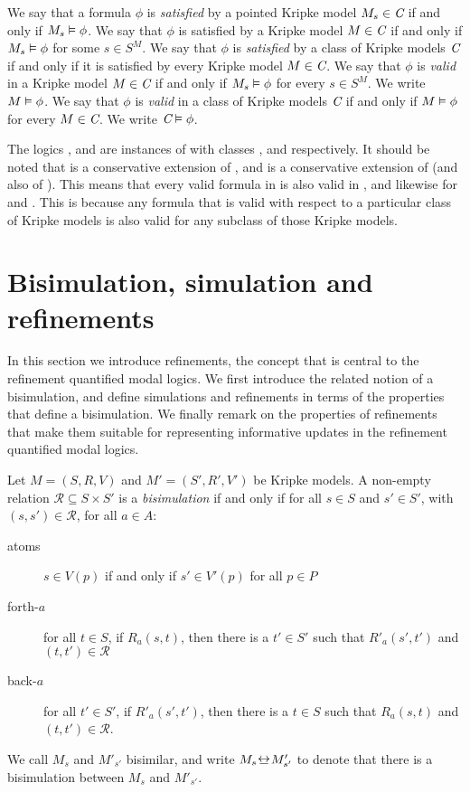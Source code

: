 We say that a formula $\phi$ is {\em satisfied} by a pointed Kripke model $M_s
\in \textit{C}$ if and only if $M_s \vDash \phi$. We say that $\phi$ is satisfied
by a Kripke model $M \in \textit{C}$ if and only if $M_s \vDash \phi$ for some $s
\in S^M$. We say that $\phi$ is {\em satisfied} by a class of Kripke models
$\textit{C}$ if and only if it is satisfied by every Kripke model $M \in \textit{C}$.
We say that $\phi$ is {\em valid} in a Kripke model $M \in \textit{C}$ if and only
if $M_s \vDash \phi$ for every $s \in S^M$. We write $M \vDash \phi$. We say
that $\phi$ is {\em valid} in a class of Kripke models $\textit{C}$ if and only if
$M \vDash \phi$ for every $M \in \textit{C}$. We write $\textit{C} \vDash \phi$.

The logics \logicK{}, \logicKD{} and \logicS{} are instances of \logicC{} with
classes \classK{}, \classKD{} and \classS{} respectively. It should be noted
that \logicKD{} is a conservative extension of \logicK{}, and \logicS{} is a
conservative extension of \logicKD{} (and also of \logicK{}). This means that
every valid formula in \logicK{} is also valid in \logicKD{}, and likewise for
\logicKD{} and \logicS{}. This is because any formula that is valid with respect
to a particular class of Kripke models is also valid for any subclass of those
Kripke models.

\section{Bisimulation, simulation and refinements}

In this section we introduce refinements, the concept that is central to the
refinement quantified modal logics. We first introduce the related notion of a
bisimulation, and define simulations and refinements in terms of the properties
that define a bisimulation. We finally remark on the properties of refinements
that make them suitable for representing informative updates in the refinement
quantified modal logics.

\begin{definition}[Bisimulation]
Let $M = (S, R, V)$ and $M' = (S', R', V')$ be Kripke models. A non-empty
relation $\mathcal{R} \subseteq S \times S'$ is a \textit{bisimulation} if and
only if for all $s \in S$ and $s' \in S'$, with $(s, s') \in \mathcal{R}$, for
all $a \in A$:

\begin{description}
\item[atoms] $s \in V(p)$ if and only if $s' \in V'(p)$ for all
$p \in P$

\item[forth-$a$] for all $t \in S$, if $R_a(s, t)$, then there is a
$t' \in S'$ such that $R'_a(s', t')$ and $(t,
t') \in \mathcal{R}$

\item[back-$a$] for all $t' \in S'$, if $R'_a(s',
t')$, then there is a $t \in S$ such that $R_a(s, t)$ and $(t, t')
\in \mathcal{R}$.
\end{description}

We call $M_s$ and $M'_{s'}$ bisimilar, and write $M_s \bisim M'_{s'}$ to denote
that there is a bisimulation between $M_s$ and $M'_{s'}$.
\end{definition}

